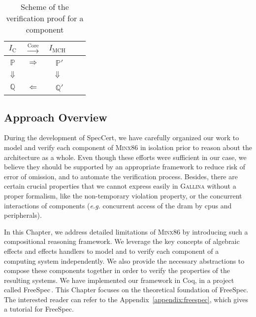 \begin{table}
  \center
  \begin{tabular}{ccccc}
    $I_{\mathrm{C}}$
    & $\xrightarrow{\mathrm{Core}}$
    & $I_{\mathrm{MCH}}$ \\
    \hline
    \hline
    $\mathbb{P}$
    & $\Longrightarrow$
    & \ $\mathbb{P}'$ \\
    $\Downarrow$
    &
    &
      $\Downarrow$ \\
    $\mathbb{Q}$
    & $\Longleftarrow$
    & \ $\mathbb{Q}'$ \\
    \hline
  \end{tabular}
  \caption{Scheme of the verification proof for a component}
\end{table}

\subsection{Approach Overview}

During the development of SpecCert, we have carefully organized our work to
model and verify each component of {\scshape Minx86} in isolation prior to
reason about the architecture as a whole.
%
Even though these efforts were sufficient in our case, we believe they should be
supported by an appropriate framework to reduce risk of error of omission, and
to automate the verification process.
%
Besides, there are certain crucial properties that we cannot express easily in
{\scshape Gallina} without a proper formalism, like the non-temporary violation
property, or the concurrent interactions of components (\emph{e.g.}  concurrent
access of the \ac{dram} by \acp{cpu} and peripherals).

In this Chapter, we address detailed limitations of {\scshape Minx86} by
introducing such a compositional reasoning framework.
%
We leverage the key concepts of algebraic effects and effects handlers to model
and to verify each component of a computing system independently.
%
We also provide the necessary abstractions to compose these components together
in order to verify the properties of the resulting systems.
%
We have implemented our framework in Coq, in a project called
FreeSpec\,\cite{letan2018freespeccode}.
%
This Chapter focuses on the theoretical foundation of FreeSpec.
%
The interested reader can refer to the Appendix~\ref{appendix:freespec}, which
gives a tutorial for FreeSpec.

